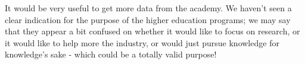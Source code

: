 \documentclass{sigchi}
\begin{document}
It would be very useful to get more data from the academy. We haven't seen a clear indication for the purpose of the higher education programs; we may say that they appear a bit confused on whether it would like to focus on research, or it would like to help more the industry, or would just pursue knowledge for knowledge's sake - which could be a totally valid purpose!

\balance{}

\balance{}



\end{document}
